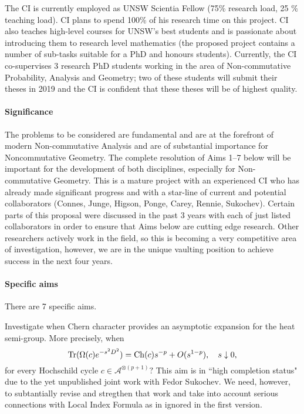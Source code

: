 \documentclass[12pt]{article}
\newcommand{\archeading}[1]{\vspace{.3cm} \noindent{\bfseries #1} \vspace{.1cm}   }
\begin{document}
The CI is currently employed as UNSW Scientia Fellow (75\% research load, 25 \% teaching load). CI plans to spend 100\% of his research time on this project. CI also teaches high-level courses for UNSW's best students and is passionate about introducing them to research level mathematics (the proposed project contains a number of sub-tasks suitable for a PhD and honours students). {\color{blue} Currently, the CI co-supervises 3 research PhD students working in the area of Non-commutative Probability, Analysis and Geometry; two of these students will submit their theses in 2019 and the CI is confident that these theses will be of highest quality. }

\bigskip\archeading{Project quality and innovation}

\paragraph*{Significance} The problems to be considered are fundamental and are at the forefront of modern Non-commutative Analysis and are of substantial importance for Noncommutative Geometry. The complete resolution of Aims 1--7 below will be important for the development of both disciplines, especially for Non-commutative Geometry. This is a mature project with an experienced CI who has already made significant progress and with a star-line of current and potential collaborators (Connes, Junge, Higson, Ponge, Carey, Rennie, Sukochev). {\color{blue} Certain parts of this proposal were discussed in the past 3 years with each of just listed collaborators in order to ensure that Aims below are cutting edge research.} Other researchers actively work in the field, so this is becoming a very competitive area of investigation, however, we are in the unique vaulting position to achieve success in the next four years.

\paragraph*{Specific aims} There are 7 specific aims.


 Investigate when Chern character provides an asymptotic expansion for the heat semi-group. More precisely, when 
\begin{equation}\label{heat eq}
{\rm Tr}(\Omega(c)e^{-s^2D^2})={\rm Ch}(c)s^{-p}+O(s^{1-p}),\quad s\downarrow0,
\end{equation}
for every Hochschild cycle $c\in\mathcal{A}^{\otimes (p+1)}?$ This aim is in ``high completion status" due to the yet unpublished joint work with Fedor Sukochev. We need, however, to subtantially revise and stregthen that work and take into account serious connections with Local Index Formula as in \cite{ConnesMoscovici, CGRS} ignored in the first version.
\end{document}
